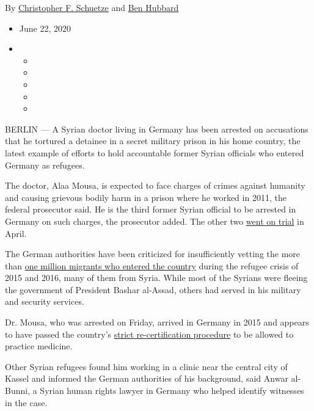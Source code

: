 By \href{https://www.nytimes.com/by/christopher-f-schuetze}{Christopher
F. Schuetze} and \href{https://www.nytimes.com/by/ben-hubbard}{Ben
Hubbard}

\begin{itemize}
\item
  June 22, 2020
\item
  \begin{itemize}
  \item
  \item
  \item
  \item
  \item
  \end{itemize}
\end{itemize}

BERLIN --- A Syrian doctor living in Germany has been arrested on
accusations that he tortured a detainee in a secret military prison in
his home country, the latest example of efforts to hold accountable
former Syrian officials who entered Germany as refugees.

The doctor, Alaa Mousa, is expected to face charges of crimes against
humanity and causing grievous bodily harm in a prison where he worked in
2011, the federal prosecutor said. He is the third former Syrian
official to be arrested in Germany on such charges, the prosecutor
added. The other two
\href{https://www.nytimes.com/2020/04/23/world/middleeast/syria-germany-war-crimes-trial.html}{went
on trial} in April.

The German authorities have been criticized for insufficiently vetting
the more than
\href{https://www.nytimes.com/2016/04/28/world/europe/germany-migrants-struggles-to-integrate.html}{one
million migrants who entered the country} during the refugee crisis of
2015 and 2016, many of them from Syria. While most of the Syrians were
fleeing the government of President Bashar al-Assad, others had served
in his military and security services.

Dr. Mousa, who was arrested on Friday, arrived in Germany in 2015 and
appears to have passed the country's
\href{https://www.nytimes.com/2018/09/08/world/europe/germany-refugees-doctors.html}{strict
re-certification procedure} to be allowed to practice medicine.

Other Syrian refugees found him working in a clinic near the central
city of Kassel and informed the German authorities of his background,
said Anwar al-Bunni, a Syrian human rights lawyer in Germany who helped
identify witnesses in the case.

